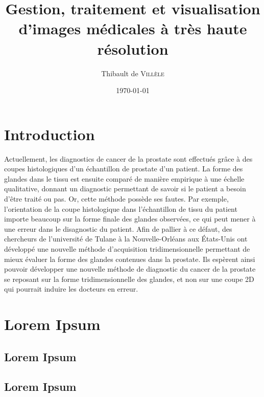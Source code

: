 \documentclass[utf8]{stageM2R}
\author{Thibault de \textsc{Villèle}}
\title{Gestion, traitement et visualisation d'images médicales à très haute résolution}
\date{\today}
\begin{document}
{
	\frontmatter  %
	\maketitle    %
	\cleardoublepage
	\tableofcontents %
	\mainmatter  %



	\chapter{Introduction}
	{
		Actuellement, les diagnostics de cancer de la prostate sont effectués grâce à des coupes histologiques d'un échantillon de prostate d'un patient. La forme des glandes dans le tissu est ensuite comparé de manière empirique à une échelle qualitative, donnant un diagnostic permettant de savoir si le patient a besoin d'être traité ou pas. Or, cette méthode possède ses fautes. Par exemple, l'orientation de la coupe histologique dans l'échantillon de tissu du patient importe beaucoup sur la forme finale des glandes observées, ce qui peut mener à une erreur dans le disagnostic du patient. Afin de pallier à ce défaut, des chercheurs de l'université de Tulane à la Nouvelle-Orléans aux États-Unis ont développé une nouvelle méthode d'acquisition tridimensionnelle permettant de mieux évaluer la forme des glandes contenues dans la prostate. Ils espèrent ainsi pouvoir développer une nouvelle méthode de diagnostic du cancer de la prostate se reposant sur la forme tridimensionnelle des glandes, et non sur une coupe 2D qui pourrait induire les docteurs en erreur.
	}

	\chapter{Lorem Ipsum}
	{
		\section{Lorem Ipsum}
		{
		}
		\section{Lorem Ipsum}
		{
		}
	}
}
\end{document}
